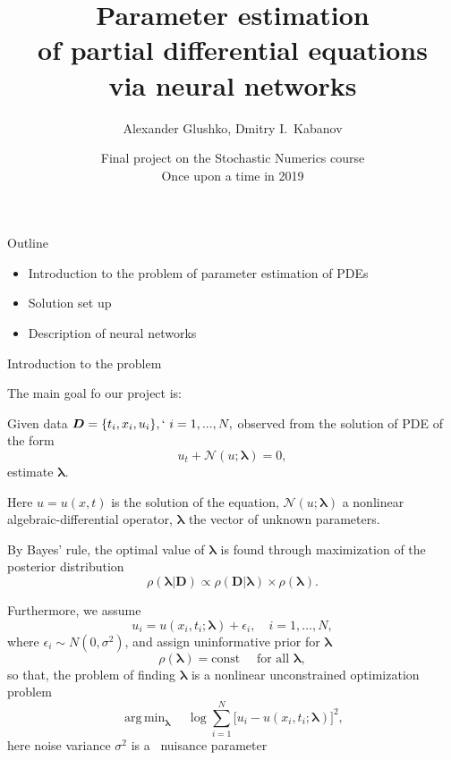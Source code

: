 \documentclass{beamer}
\title{Parameter estimation\\of partial differential equations\\via neural networks}
\author{Alexander Glushko, Dmitry I.\ Kabanov}
\date{Final project on the Stochastic Numerics course\\Once upon a time in 2019}
\newcommand{\Data}{\vec{D}}
\renewcommand{\vec}[1]{\boldsymbol{#1}}
\newcommand{\VLambda}{\ensuremath{\vec{\lambda}}}
\DeclareMathOperator*{\argmin}{arg\,min}
\newcommand{\NonlinOp}{\mathcal N\!}
\begin{document}
\maketitle

\begin{frame}{Outline}
\begin{itemize}
    \item Introduction to the problem of parameter estimation of PDEs
    \item Solution set up
    \item Description of neural networks
\end{itemize}
\end{frame}

\begin{frame}{Introduction to the problem}

The main goal fo our project is:

Given data $\vec{D} = \{t_i, x_i, u_i\},`~i = 1, ..., N,$ observed from the solution of PDE of the form
\begin{equation*}
    \label{eq:pde}
    u_t + \mathcal N\!(u; \VLambda) = 0,
\end{equation*}
estimate $\VLambda$.

Here $u=u(x, t)$ is the solution of the equation,
$\NonlinOp(u; \VLambda)$ a nonlinear algebraic-differential operator,
$\VLambda$ the vector of unknown parameters.

\end{frame}

\begin{frame}

By Bayes' rule, the optimal value of $\VLambda$ is found through
maximization of the posterior distribution \cite{sivia2006data}
\begin{equation*}
    \rho( \VLambda | \Data ) \propto
    \rho( \Data | \VLambda ) \times \rho( \VLambda ).
\end{equation*}

Furthermore, we assume
\begin{equation*}
    u_i = u(x_i, t_i; \VLambda) + \epsilon_i, \quad i=1, \dots, N,
\end{equation*}
where $\epsilon_i \sim N(0, \sigma^2)$, and assign uninformative prior for $\VLambda$
\begin{equation*}
    \rho(\vec{\lambda}) = \text{const} \quad \text{ for all } \vec{\lambda},
\end{equation*}
so that, the problem of finding $\VLambda$ is a nonlinear unconstrained
optimization problem
\begin{equation*}
    \label{eq:optim-ideal}
    \argmin_{\VLambda} \quad 
    \log \sum_{i=1}^{N} \big[ u_i - u(x_i, t_i; \VLambda) \big]^2,
\end{equation*}
here noise variance $\sigma^2$ is a~
nuisance parameter~\cite[section~8.2]{sivia2006data}
    
\end{frame}
\end{document}
